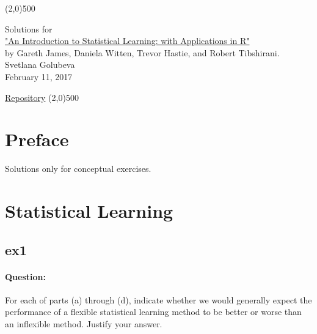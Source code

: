 \documentclass[a4paper,12pt,titlepage]{article} %
\begin{document}
\begin{titlepage}

\begin{center}
	\line(2,0){500}
\end{center}

\vspace{60pt}

\begin{center}	
	{\Large{Solutions for}}\\
	\vspace{20pt}
	\href{http://www.springer.com/us/book/9781461471370}{\Huge{"An Introduction to Statistical Learning: with Applications in R"}}\\
	\vspace{20pt}
	{\LARGE{by Gareth James, Daniela Witten, Trevor Hastie, and Robert Tibshirani.}}\\
	\vspace{20pt}
	Svetlana Golubeva\\
	\vspace{20pt}
	February 11, 2017
\end{center}

\vspace{\fill}
\begin{center}
	\href{https://github.com/attillax/ISL}{Repository}
	\line(2,0){500}
\end{center}

\end{titlepage}

\tableofcontents
\newpage
\section{Preface}

Solutions only for conceptual exercises.

\newpage
\section{Statistical Learning}
\subsection{ex1}
\paragraph{Question:} For each of parts (a) through (d), indicate whether we would generally expect the performance of a flexible statistical learning method to be better or worse than an inflexible method. Justify your answer.
\end{document}
